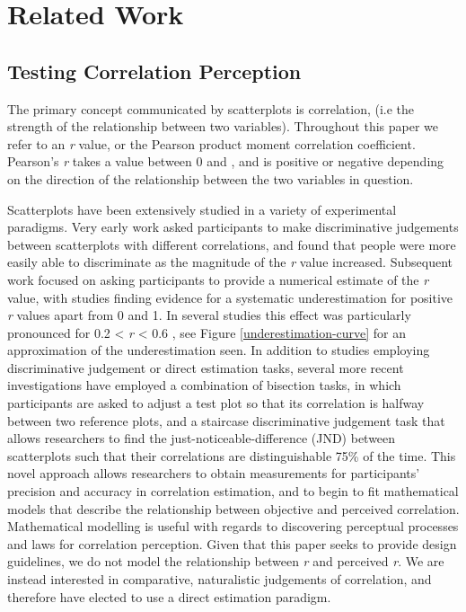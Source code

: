 \documentclass[preprint, 3p,
authoryear]{elsarticle} %
\begin{document}
\hypertarget{related-work}{%
\section{Related Work}\label{related-work}}

\hypertarget{testing-correlation-perception}{%
\subsection{Testing Correlation
Perception}\label{testing-correlation-perception}}

The primary concept communicated by scatterplots is correlation, (i.e
the strength of the relationship between two variables). Throughout this
paper we refer to an \emph{r} value, or the Pearson product moment
correlation coefficient. Pearson's \emph{r} takes a value between 0 and
\textbar, and is positive or negative depending on the
direction of the relationship between the two variables in question.

Scatterplots have been extensively studied in a variety of experimental
paradigms. Very early work \citep{pollack_1960} asked participants to
make discriminative judgements between scatterplots with different
correlations, and found that people were more easily able to
discriminate as the magnitude of the \emph{r} value increased.
Subsequent work focused on asking participants to provide a numerical
estimate of the \emph{r} value, with studies finding evidence for a
systematic underestimation for positive \emph{r} values apart from 0 and
1. In several studies this effect was particularly pronounced for 0.2
\textless{} \emph{r} \textless{} 0.6
\citep{strahan_1978, bobko_1979, cleveland_1982, lane_1985, lauer_1989, collyer_1990, meyer_1992},
see Figure \ref{underestimation-curve} for an approximation of the
underestimation seen. In addition to studies employing discriminative
judgement or direct estimation tasks, several more recent investigations
have employed a combination of bisection tasks, in which participants
are asked to adjust a test plot so that its correlation is halfway
between two reference plots, and a staircase discriminative judgement
task that allows researchers to find the just-noticeable-difference
(JND) between scatterplots such that their correlations are
distinguishable 75\% of the time. This novel approach
\citep{rensink_2010} allows researchers to obtain measurements for
participants' precision and accuracy in correlation estimation, and to
begin to fit mathematical models that describe the relationship between
objective and perceived correlation. Mathematical modelling is useful
with regards to discovering perceptual processes and laws for
correlation perception. Given that this paper seeks to provide design
guidelines, we do not model the relationship between \emph{r} and
perceived \emph{r}. We are instead interested in comparative,
naturalistic judgements of correlation, and therefore have elected to
use a direct estimation paradigm.
\end{document}
